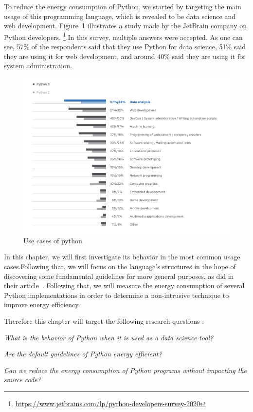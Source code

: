 To reduce the energy consumption of Python, we started by targeting the main usage of this programming language, which is revealed to be data science and web development. Figure~\ref{fig:usecase} illustrates a study made by the JetBrain company on Python developers. \footnote{\url{https://www.jetbrains.com/lp/python-developers-survey-2020}}.In this survey, multiple answers were accepted. As one can see, 57\% of the respondents said that they use Python for data science, 51\% said they are using it for web development, and around 40\% said they are using it for system administration.
\begin{figure}[hbt]
    \centering
    \includegraphics[width=\linewidth]{imgs/python_use_cases}
    \caption{Use cases of python }
    \label{fig:usecase}
\end{figure}

In this chapter, we will first investigate its behavior in the most common usage cases.Following that, we will focus on the language's structures in the hope of discovering some fundamental guidelines for more general purposes, as \citeauthor{hasan_energy_2016-1} did in their article~\cite{hasan_energy_2016-1}.
Following that, we will measure the energy consumption of several Python implementations in order to determine a non-intrusive technique to improve energy efficiency.

Therefore this chapter will target the following research questions :
\begin{compactenum}[\indent\bf RQ\,1:]
    \item \emph{What is the behavior of Python when it is used as a data science tool?}
    \item \emph{Are the default guidelines of Python energy efficient?}
    \item \emph{Can we reduce the energy consumption of Python programs without impacting the source code?}
\end{compactenum}




